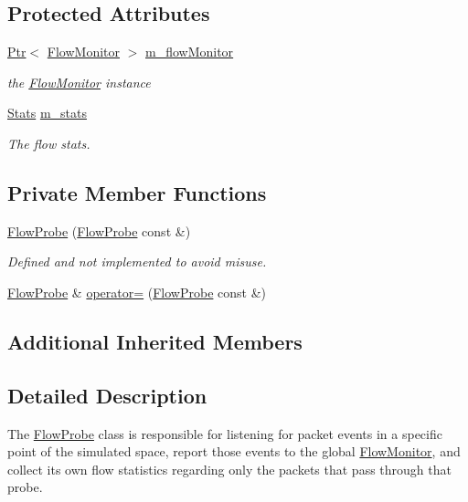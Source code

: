 \subsection*{Protected Attributes}
\begin{DoxyCompactItemize}
\item 
\hyperlink{classns3_1_1Ptr}{Ptr}$<$ \hyperlink{classns3_1_1FlowMonitor}{Flow\+Monitor} $>$ \hyperlink{classns3_1_1FlowProbe_adab205c7ab7cf4c65d72d030d8aaa82a}{m\+\_\+flow\+Monitor}
\begin{DoxyCompactList}\small\item\em the \hyperlink{classns3_1_1FlowMonitor}{Flow\+Monitor} instance \end{DoxyCompactList}\item 
\hyperlink{classns3_1_1FlowProbe_a6e09fdef49c914b417bcea3bfb4ca53d}{Stats} \hyperlink{classns3_1_1FlowProbe_a33e073a315870591d4c8e9a1001b2a8b}{m\+\_\+stats}
\begin{DoxyCompactList}\small\item\em The flow stats. \end{DoxyCompactList}\end{DoxyCompactItemize}
\subsection*{Private Member Functions}
\begin{DoxyCompactItemize}
\item 
\hyperlink{classns3_1_1FlowProbe_ae0c5dae57bca03719808497381a24776}{Flow\+Probe} (\hyperlink{classns3_1_1FlowProbe}{Flow\+Probe} const \&)
\begin{DoxyCompactList}\small\item\em Defined and not implemented to avoid misuse. \end{DoxyCompactList}\item 
\hyperlink{classns3_1_1FlowProbe}{Flow\+Probe} \& \hyperlink{classns3_1_1FlowProbe_a1a3b9fa216d64f87847e8414c577cd55}{operator=} (\hyperlink{classns3_1_1FlowProbe}{Flow\+Probe} const \&)
\end{DoxyCompactItemize}
\subsection*{Additional Inherited Members}


\subsection{Detailed Description}
The \hyperlink{classns3_1_1FlowProbe}{Flow\+Probe} class is responsible for listening for packet events in a specific point of the simulated space, report those events to the global \hyperlink{classns3_1_1FlowMonitor}{Flow\+Monitor}, and collect its own flow statistics regarding only the packets that pass through that probe. 

